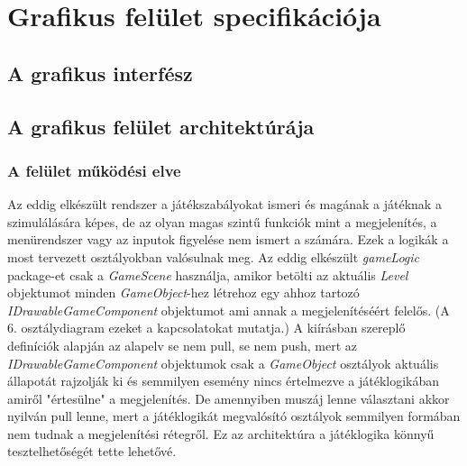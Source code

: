 


\setcounter{section}{10}




\fedlap

\section{Grafikus felület specifikációja}

\subsection{A grafikus interfész}

\subsection{A grafikus felület architektúrája}

\subsubsection{A felület működési elve}

Az eddig elkészült rendszer a játékszabályokat ismeri és magának a játéknak a szimulálására képes, de az olyan magas szintű funkciók mint a megjelenítés, a menürendszer vagy az inputok figyelése nem ismert a számára. Ezek a logikák a most tervezett osztályokban valósulnak meg. Az eddig elkészült \emph{gameLogic} package-et csak a \emph{GameScene} használja, amikor betölti az aktuális \emph{Level} objektumot minden \emph{GameObject}-hez létrehoz egy ahhoz tartozó \emph{IDrawableGameComponent} objektumot ami annak a megjelenítéséért felelős. (A 6. osztálydiagram ezeket a kapcsolatokat mutatja.) A kiírásban szereplő definíciók alapján az alapelv se nem pull, se nem push, mert az \emph{IDrawableGameComponent} objektumok csak a \emph{GameObject} osztályok aktuális állapotát rajzolják ki és semmilyen esemény nincs értelmezve a játéklogikában amiről "értesülne" a megjelenítés. De amennyiben muszáj lenne választani akkor nyilván pull lenne, mert a játéklogikát megvalósító osztályok semmilyen formában nem tudnak a megjelenítési rétegről. Ez az architektúra a játéklogika könnyű tesztelhetőségét tette lehetővé.

